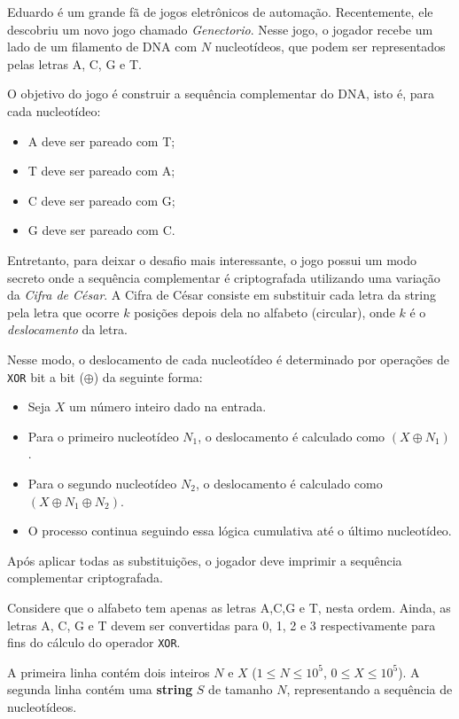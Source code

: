 Eduardo é um grande fã de jogos eletrônicos de automação. Recentemente, ele descobriu um novo jogo chamado \textit{Genectorio}. Nesse jogo, o jogador recebe um lado de um filamento de DNA com $N$ nucleotídeos, que podem ser representados pelas letras A, C, G e T.

O objetivo do jogo é construir a sequência complementar do DNA, isto é, para cada nucleotídeo:
\begin{multicols}{2}
\begin{itemize}
  \item A deve ser pareado com T;
  \item T deve ser pareado com A;
  \item C deve ser pareado com G;
  \item G deve ser pareado com C.
\end{itemize}
\end{multicols}
\vspace{-0.5cm}
Entretanto, para deixar o desafio mais interessante, o jogo possui um modo secreto onde a sequência complementar é criptografada utilizando uma variação da \textit{Cifra de César}. A Cifra de César consiste em substituir cada letra da string pela letra que ocorre $k$ posições depois dela no alfabeto (circular), onde $k$ é o \textit{deslocamento} da letra.

Nesse modo, o deslocamento de cada nucleotídeo é determinado por operações de
\texttt{XOR} bit a bit ($\oplus$) da seguinte forma:
\begin{itemize}
  \item Seja $X$ um número inteiro dado na entrada.
  \item Para o primeiro nucleotídeo $N_1$, o deslocamento é calculado como $(X \oplus N_1)$.
  \item Para o segundo nucleotídeo $N_2$, o deslocamento é calculado como $(X \oplus N_1 \oplus N_2)$.
  \item O processo continua seguindo essa lógica cumulativa até o último nucleotídeo.
\end{itemize}

Após aplicar todas as substituições, o jogador deve imprimir a sequência complementar criptografada.

Considere que o alfabeto tem apenas as letras A,C,G e T, nesta ordem. Ainda, as letras A, C, G e T devem ser convertidas para 0, 1, 2 e 3 respectivamente para fins do cálculo do operador \texttt{XOR}.

A primeira linha contém dois inteiros $N$ e $X$ ($1 \le N \le 10^5$, $0 \leq X \leq 10^5$).
A segunda linha contém uma \textbf{string} $S$ de tamanho $N$, representando a sequência de nucleotídeos.
\vspace{-0.3cm}

